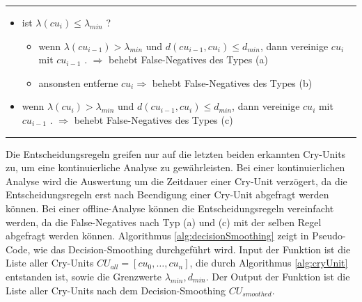 \pagebreak
\noindent\rule{\linewidth}{0.3pt}
\begin{itemize}
	\item ist $\lambda (cu_{i}) \leq \lambda_{min}$ ?
	\begin{itemize}
		\item wenn $\lambda (cu_{i-1}) > \lambda_{min}$ und $d (cu_{i-1}, cu_{i}) \leq d_{min}$, dann vereinige $cu_{i}$ mit $cu_{i-1}$ . $\Longrightarrow$ behebt False-Negatives des Types (a)
		\item ansonsten entferne $cu_i \Longrightarrow$ behebt False-Negatives des Types (b)
	\end{itemize}
	\item wenn $\lambda (cu_{i}) > \lambda_{min}$ und $d (cu_{i-1}, cu_{i}) \leq d_{min}$, dann vereinige $cu_{i}$ mit $cu_{i-1}$ . $\Rightarrow$ behebt False-Negatives des Types (c)
\end{itemize}
\noindent\rule{\linewidth}{0.3pt}

Die Entscheidungsregeln greifen nur auf die letzten beiden erkannten Cry-Units zu, um eine kontinuierliche Analyse zu gewährleisten. Bei einer kontinuierlichen Analyse wird die Auswertung um die Zeitdauer einer Cry-Unit verzögert, da die Entscheidungsregeln erst nach Beendigung einer Cry-Unit abgefragt werden können. Bei einer offline-Analyse können die Entscheidungsregeln vereinfacht werden, da die False-Negatives nach Typ (a) und (c) mit der selben Regel abgefragt werden können. Algorithmus \ref{alg:decisionSmoothing} zeigt in Pseudo-Code, wie das Decision-Smoothing durchgeführt wird. Input der Funktion ist die Liste aller Cry-Units $CU_{all} = [cu_0 , \ldots , cu_n]$, die durch Algorithmus \ref{alg:cryUnit} entstanden ist, sowie die Grenzwerte $\lambda_{min}, d_{min}$. Der Output der Funktion ist die Liste aller Cry-Units nach dem Decision-Smoothing $CU_{smoothed}$.

